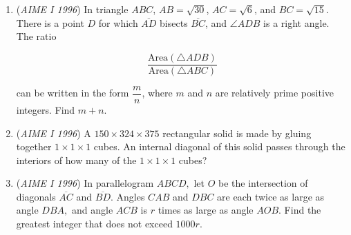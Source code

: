 \begin{enumerate}
 

	\item (\textit{AIME I 1996}) In triangle $ABC$, $AB=\sqrt{30}$, $AC=\sqrt{6}$, and $BC=\sqrt{15}$. There is a point $D$ for which $\overline{AD}$ bisects $\overline{BC}$, and $\angle ADB$ is a right angle. The ratio


 
 \[\dfrac{\text{Area}(\triangle ADB)}{\text{Area}(\triangle ABC)}\]


 can be written in the form $\dfrac{m}{n}$, where $m$ and $n$ are relatively prime positive integers. Find $m+n$.


 

	\item (\textit{AIME I 1996}) A $150\times 324\times 375$ rectangular solid is made by gluing together $1\times 1\times 1$ cubes. An internal diagonal of this solid passes through the interiors of how many of the $1\times 1\times 1$ cubes?


 

	\item (\textit{AIME I 1996}) In parallelogram $ABCD,$ let $O$ be the intersection of diagonals $\overline{AC}$ and $\overline{BD}$. Angles $CAB$ and $DBC$ are each twice as large as angle $DBA,$ and angle $ACB$ is $r$ times as large as angle $AOB$. Find the greatest integer that does not exceed $1000r$.


 

\end{enumerate}